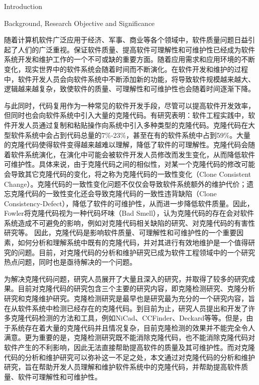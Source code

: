 
{Introduction}

{Background, Research Objective and Significance}

随着计算机软件广泛应用于经济、军事、商业等各个领域中，软件质量问题日益引起了人们的广泛重视。保证软件质量、提高软件可理解性和可维护性已经成为软件系统开发和维护工作的一个不可或缺的重要方面。随着应用需求和应用环境的不断变化，现实世界中的软件系统会随着时间而不断演化。在软件开发和维护的过程中，软件开发人员会向软件系统中不断添加新的功能，将导致软件规模越来越大、逻辑越来越复杂，致使软件的质量、可理解性和可维护性也会随着时间逐渐下降。

与此同时，代码复用作为一种常见的软件开发手段，尽管可以提高软件开发效率，但同时也会向软件系统中引入大量的克隆代码。有研究表明：软件工程实践中，软件开发人员通过复制和粘贴操作向系统中引入多种类型的克隆代码\cite{roy2007survey}。克隆代码在大型软件系统中会占到代码总量的7\%-23\%\cite{baker1995finding,kontogiannis1996pattern,lague1997assessing}，甚至在有的软件系统中占到59\%\cite{ducasse1999language}。大量的克隆代码使得软件变得越来越难以理解，降低了软件的可理解性。克隆代码会随着软件系统演化，在演化中可能会被软件开发人员修改而发生变化，从而降低软件可维护性。具体来说，由于克隆代码之间的相似性，对某一个克隆代码的修改可能会导致其它克隆代码的变化，将之称为克隆代码的一致性变化（Clone Consistent Change）。克隆代码的一致性变化问题不仅仅会导致软件系统额外的维护代价；遗忘克隆代码的一致性变化还会导致克隆代码的一致性违背缺陷（Clone Consistency-Defect），降低了软件的可维护性，从而进一步降低软件质量。因此，Fowler将克隆代码视为一种代码坏味（Bad Smell）\cite{fowler2009refactoring}，认为克隆代码的存在会对软件系统造成不可避免的影响，例如对克隆代码相关缺陷的研究\cite{juergens2009code,gauthier2013uncovering,wagner2016relationship}、对克隆代码的有害性研究\cite{kapser2008cloning,selim2010studying,wang2012can}等。
因此，克隆代码是影响软件质量、可理解性和可维护性的一个重要因素，如何分析和理解系统中既有的克隆代码，并对其进行有效地维护是一个值得研究的问题。目前，对克隆代码的分析和维护研究已成为软件工程领域中的一个研究热点问题，同时也是亟待解决的一个问题。

为解决克隆代码问题，研究人员展开了大量且深入的研究，并取得了较多的研究成果。目前对克隆代码的研究包含三个主要的研究内容，即克隆检测研究、克隆分析研究和克隆维护研究。克隆检测研究是最早也是研究最为充分的一个研究内容，旨在从软件系统中检测已经存在的克隆代码。到目前为止，研究人员提出和开发了许多克隆代码检测的方法和工具，例如NiCad\cite{roy2008nicad}、CCFinder\cite{kamiya2002ccfinder}、Deckard\cite{jiang2007deckard}等等。但是，由于系统存在着大量的克隆代码并且情况复杂，目前克隆检测的效果并不能完全令人满意。更为重要的是，克隆检测研究既不能消除克隆代码，也不能消除克隆代码对软件产生的不利影响，因此无法直接帮助提高软件的质量及其可维护性。而对克隆代码的分析和维护研究可以弥补这一不足之处，本文通过对克隆代码的分析和维护研究，旨在帮助开发人员理解和维护软件系统中的克隆代码，并帮助提高软件质量、软件可理解性和可维护性。


